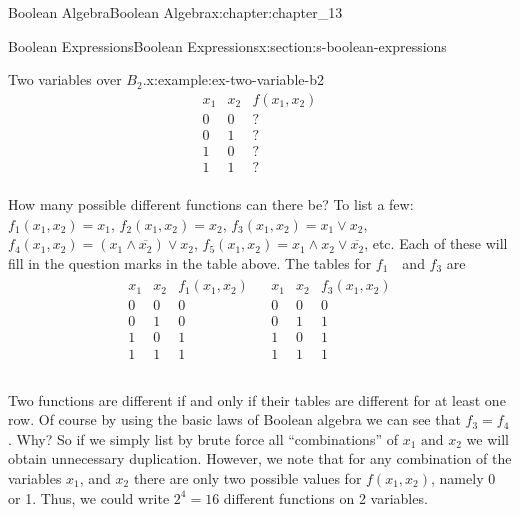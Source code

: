 \documentclass[oneside,10pt,]{book}
\numberwithin{equation}{section}
\begin{document}
\begin{chapterptx}{Boolean Algebra}{}{Boolean Algebra}{}{}{x:chapter:chapter_13}
\begin{sectionptx}{Boolean Expressions}{}{Boolean Expressions}{}{}{x:section:s-boolean-expressions}
\begin{example}{Two variables over \(B_2\).}{x:example:ex-two-variable-b2}
\begin{equation*}
\begin{array}{cc|c}
x_1 & x_2 & f\left(x_1,x_2\right) \\
\hline
0 & 0 & ?\\
0 & 1 & ?\\
1 & 0 & ?\\
1 & 1 & ?\\
\end{array}
\end{equation*}
%
\par
How many possible different functions can there be? To list a few:\(f_1\left(x_1, x_2\right)=x_1\), \(f_2\left(x_1,
x_2\right)=x_2\), \(f_3\left(x_1, x_2\right)=x_1\lor x_2\), \(f_4\left(x_1, x_2\right)=\left(x_1\land \overline{x_2}\right)\lor x_2\), \(f_5\left(x_1,
x_2\right)= x_1\land x_2\lor \overline{x_2}\), etc. Each of these will fill in the question marks in the table above. The tables for \(f_1\textrm{ }\) and \(f_3\) are%
\begin{equation*}
\begin{array}{lr}
\begin{array}{cc|c}
x_1 & x_2 & f_1\left(x_1,x_2\right) \\
\hline
0 & 0 & 0\\
0 & 1 & 0\\
1 & 0 & 1\\
1 & 1 & 1\\
\end{array}  &
\begin{array}{cc|c}
x_1 & x_2 & f_3\left(x_1,x_2\right) \\
\hline
0 & 0 & 0\\
0 & 1 & 1\\
1 & 0 & 1\\
1 & 1 & 1\\
\end{array}\\
\end{array}
\end{equation*}
%
\par
Two functions are different if and only if their tables are different for at least one row.  Of course by using the basic laws of Boolean algebra we can see that \(f_3=f_4\). Why? So if we simply list by brute force all ``combinations'' of \(x_1 \textrm{ and } x_2\) we will obtain unnecessary duplication. However, we note that for any combination of the variables \(x_1\), and \(x_2\) there are only two possible values for \(f\left(x_1, x_2\right)\), namely 0 or 1. Thus, we could write \(2^4=16\) different functions on 2 variables.%

\end{example}
\end{sectionptx}
\end{chapterptx}
\end{document}
